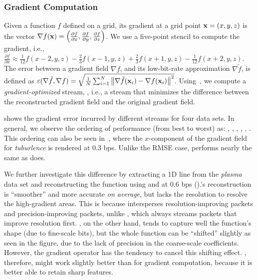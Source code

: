 \subsubsection{Gradient Computation} \label{sec:gradient}

Given a function $f$ defined on a grid, its gradient at a grid point \mbox{$\x = (x,y,z)$} is the
vector $\nabla f(\x) = \left(\frac{\partial f}{\partial x}, \frac{\partial f}{\partial y},
\frac{\partial f}{\partial z}\right)$. We use a five-point stencil to compute the gradient, i.e.,
$\frac{\partial f}{\partial x} \approx \frac{1}{12}f(x-2,y,z) - \frac{2}{3}f(x-1,y,z) +
\frac{2}{3}f(x+1,y,z) - \frac{1}{12}f(x+2,y,z)$. The error between a gradient field $\nabla f$, and
its low-bit-rate approximation $\nabla
\tilde{f}$, is defined as $\err(\nabla \tilde{f}, \nabla f) = \sqrt{\frac{1}{N}
\sum_{i=1}^{N}{\norm{\nabla \tilde{f}(\x_i)-\nabla f(\x_i)}^2}}$. Using~, we
compute a \emph{gradient-optimized} stream, \sgop, i.e., a stream that minimizes the difference
between the reconstructed gradient field and the original gradient field.

 shows the gradient error incurred by different streams for four
data sets. In general, we observe the ordering of performance (from best to worst) as: \sgop, \sgsg,
\sbit, \swav, \smag, \slvl. This ordering can also be seen in~,
where the $x$-component of the gradient field for \emph{tuburlence} is rendered at 0.3 bps. Unlike
the RMSE case, \sbit performs nearly the same as \swav does.

We further investigate this difference by extracting a 1D line from the \emph{plasma} data set and
reconstructing the function using \sbit and \swav at 0.6 bps
().\swav's reconstruction is ``smoother'' and more
accurate \emph{on average}, but lacks the resolution to resolve the high-gradient areas. This is
because \swav intersperses resolution-improving packets and precision-improving packets, unlike
\sbit, which always streams packets that improve resolution first. \sbit, on the other hand, tends
to capture well the function's shape (due to fine-scale bits), but the whole function can be
``shifted'' slightly as seen in the figure, due to the lack of precision in the coarse-scale
coefficients. However, the gradient operator has the tendency to cancel this shifting effect. \sbit,
therefore, might work slightly better than \swav for gradient computation, because it is better able
to retain sharp features.


